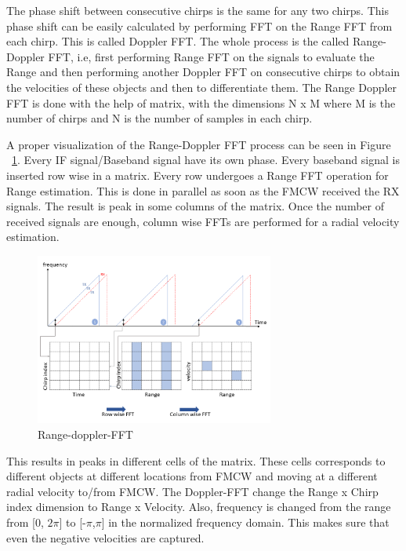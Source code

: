 The phase shift between consecutive chirps is the same for any two chirps. This phase shift can be easily calculated by performing FFT on the Range FFT from each chirp. This is called Doppler FFT. The whole process is the called Range-Doppler FFT, i.e, first performing Range FFT on the signals to evaluate the Range and then performing another Doppler FFT on consecutive chirps to obtain the velocities of these objects and then to differentiate them. 
The Range Doppler FFT is done with the help of matrix, with the dimensions N x M where M is the number of chirps and N is the number of samples in each chirp.

A proper visualization of the Range-Doppler FFT process can be seen in Figure ~\ref{fig:range-doppler-FFT}. Every IF signal/Baseband signal have its own phase. Every baseband signal is inserted row wise in a matrix. Every row undergoes a Range FFT operation for Range estimation. This is done in parallel as soon as the FMCW received the RX signals. The result is peak in some columns of the matrix. Once the number of received signals are enough, column wise FFTs are performed for a radial velocity estimation.
 \begin{figure}[ht]
  \begin{center}
    \includegraphics[width=0.7\textwidth]{Master's thesis/images/range_doppler1.png}
    \caption{Range-doppler-FFT}
    \label{fig:range-doppler-FFT}
  \end{center}
\end{figure}  



This results in peaks in different cells of the matrix. These cells corresponds to different objects at different locations from FMCW and moving at a different radial velocity to/from FMCW. The Doppler-FFT change the Range x Chirp index dimension to Range x Velocity. Also, frequency is changed from the range from [0, $2\pi$] to [-$\pi$,$\pi$] in the normalized frequency domain. This makes sure that even the negative velocities are captured.

